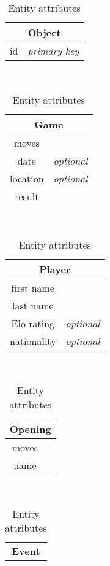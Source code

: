 \documentclass{article}
\begin{document}
\begin{table}[ht!]
    \caption{Entity attributes}
    \label{attr}
    
    \begin{subtable}{3.5cm}
	\begin{tabular}[t]{|cr|}
	\hline
	\multicolumn{2}{|c|}{\textbf{Object}} \\
	\hline 
	id & \em{primary key} \\
	\hline
	\end{tabular}
    \end{subtable}
    ~
    \begin{subtable}{3.5cm}
	\begin{tabular}[t]{|cr|}
	\hline
	\multicolumn{2}{|c|}{\textbf{Game}} \\
	\hline 
	moves    &                  \\
	date     & \em{optional}    \\
	location & \em{optional}    \\
	result   &                  \\
	\hline
	\end{tabular}
    \end{subtable}
    ~
    \begin{subtable}{3.5cm}
	\begin{tabular}[t]{|cr|}
	\hline
	\multicolumn{2}{|c|}{\textbf{Player}} \\
	\hline 
	first name   &                  \\
	last name    &                  \\
	Elo rating   & \em{optional}    \\
	nationality  & \em{optional}    \\
	\hline
	\end{tabular}
    \end{subtable}
    ~
    \begin{subtable}{3.5cm}
	\begin{tabular}[t]{|cr|}
	\hline
	\multicolumn{2}{|c|}{\textbf{Opening}} \\
	\hline
	moves  &                  \\
	name   &                  \\
	\hline
	\end{tabular}
    \end{subtable}
    ~
    \begin{subtable}{3.5cm}
	\begin{tabular}[t]{|cr|}
	\hline
	\multicolumn{2}{|c|}{\textbf{Event}} \\

\end{tabular}
\end{subtable}
\end{table}
\end{document}

